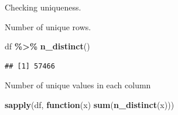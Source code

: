 \documentclass[
]{article}
\newenvironment{Shaded}{\begin{snugshade}}{\end{snugshade}}
\newcommand{\ControlFlowTok}[1]{\textcolor[rgb]{0.13,0.29,0.53}{\textbf{#1}}}
\newcommand{\FunctionTok}[1]{\textcolor[rgb]{0.13,0.29,0.53}{\textbf{#1}}}
\newcommand{\NormalTok}[1]{#1}
\newcommand{\SpecialCharTok}[1]{\textcolor[rgb]{0.81,0.36,0.00}{\textbf{#1}}}
\begin{document}
Checking uniqueness.

Number of unique rows.

\begin{Shaded}
\begin{Highlighting}[]
\NormalTok{df }\SpecialCharTok{\%\textgreater{}\%} \FunctionTok{n\_distinct}\NormalTok{()}
\end{Highlighting}
\end{Shaded}

\begin{verbatim}
## [1] 57466
\end{verbatim}

Number of unique values in each column

\begin{Shaded}
\begin{Highlighting}[]
\FunctionTok{sapply}\NormalTok{(df, }\ControlFlowTok{function}\NormalTok{(x) }\FunctionTok{sum}\NormalTok{(}\FunctionTok{n\_distinct}\NormalTok{(x)))}
\end{Highlighting}
\end{Shaded}
\end{document}
